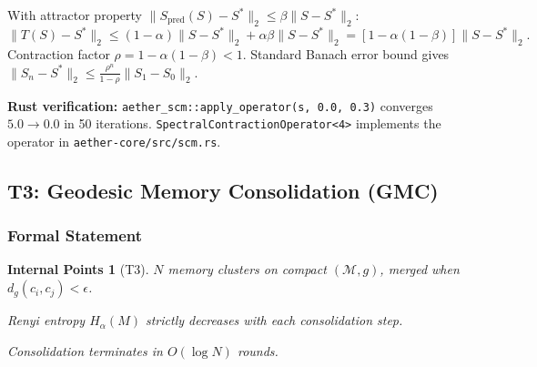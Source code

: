 \documentclass[11pt, a4paper]{article}
\theoremstyle{proofform}
\newtheorem{innerpoints}{Internal Points}
\numberwithin{innerpoints}{subsection}
\numberwithin{disproof}{subsection}
\theoremstyle{mathproof}
\begin{document}
\begin{Proof}
With attractor property $\|S_{\text{pred}}(S) - S^*\|_2 \leq \beta\|S - S^*\|_2$:
\[
\|T(S) - S^*\|_2 \leq (1-\alpha)\|S - S^*\|_2 + \alpha\beta\|S - S^*\|_2 = [1 - \alpha(1-\beta)]\|S - S^*\|_2.
\]
Contraction factor $\rho = 1 - \alpha(1-\beta) < 1$. Standard Banach error bound gives $\|S_n - S^*\|_2 \leq \frac{\rho^n}{1-\rho}\|S_1 - S_0\|_2$.

\textbf{Rust verification:} \texttt{aether\_scm::apply\_operator(s, 0.0, 0.3)} converges $5.0 \to 0.0$ in 50 iterations. \texttt{SpectralContractionOperator<4>} implements the operator in \texttt{aether-core/src/scm.rs}.
\end{Proof}

\subsection{T3: Geodesic Memory Consolidation (GMC)}
\label{sec:gmc}

\subsubsection*{Formal Statement}
\begin{innerpoints}[T3]
\item $N$ memory clusters on compact $(\mathcal{M}, g)$, merged when $d_g(c_i, c_j) < \epsilon$.
\item Renyi entropy $H_\alpha(M)$ strictly decreases with each consolidation step.
\item Consolidation terminates in $O(\log N)$ rounds.
\end{innerpoints}
\end{document}
